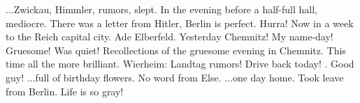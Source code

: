 ...Zwickau, Himmler, rumors, slept. In the evening \missing before a half-full hall, mediocre. There was a letter from Hitler, Berlin is perfect. Hurra! Now in a week to the Reich capital city. Ade Elberfeld. Yesterday Chemnitz! My name-day! Gruesome! Was quiet! Recollections of the gruesome evening in Chemnitz. This time all the more brilliant. Wierheim: Landtag rumors! Drive back today! . Good guy! ...full of birthday flowers. No word from Else. ...one day home. Took leave from Berlin. Life is so gray!